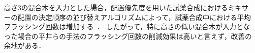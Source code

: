 



高さ3の混合木を入力とした場合，配置優先度を用いた試薬合成におけるミキサーの配置の決定順序の並び替えアルゴリズムによって，試薬合成中における平均フラッシング回数は増加する~\cite{10089903}．
したがって，特に高さの低い混合木が入力となった場合の平井らの手法のフラッシング回数の削減効果は高いと言えず，改善の余地がある．

